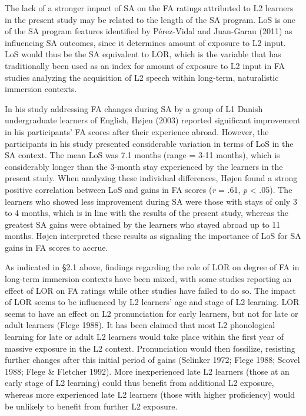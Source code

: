 \documentclass[12pt]{article}
\newenvironment{styleStandard}{\setlength\leftskip{0cm}\setlength\rightskip{0cm plus 1fil}\setlength\parindent{0cm}\setlength\parfillskip{0pt plus 1fil}\setlength\parskip{0in plus 1pt}\writerlistparindent\writerlistleftskip\leavevmode\normalfont\normalsize\writerlistlabel\ignorespaces}{\unskip\vspace{0.111in plus 0.0111in}\par}
\newcommand\writerlistleftskip{}
\newcommand\writerlistparindent{}
\newcommand\writerlistlabel{}
\begin{document}
\begin{styleStandard}
The lack of a stronger impact of SA on the FA ratings attributed to L2 learners in the present study may be related to the length of the SA program. LoS is one of the SA program features identified by Pérez-Vidal and Juan-Garau (2011) as influencing SA outcomes, since it determines amount of exposure to L2 input. LoS would thus be the SA equivalent to LOR, which is the variable that has traditionally been used as an index for amount of exposure to L2 input in FA studies analyzing the acquisition of L2 speech within long-term, naturalistic immersion contexts. 
\end{styleStandard}

\begin{styleStandard}
In his study addressing FA changes during SA by a group of L1 Danish undergraduate learners of English, Højen (2003) reported significant improvement in his participants’ FA scores after their experience abroad. However, the participants in his study presented considerable variation in terms of LoS in the SA context. The mean LoS was 7.1 months (range = 3-11 months), which is considerably longer than the 3-month stay experienced by the learners in the present study. When analyzing these individual differences, Højen found a strong positive correlation between LoS and gains in FA scores (\textit{r} = .61, \textit{p} {\textless} .05). The learners who showed less improvement during SA were those with stays of only 3 to 4 months, which is in line with the results of the present study, whereas the greatest SA gains were obtained by the learners who stayed abroad up to 11 months. Højen interpreted these results as signaling the importance of LoS for SA gains in FA scores to accrue.
\end{styleStandard}

\begin{styleStandard}
As indicated in §2.1 above, findings regarding the role of LOR on degree of FA in long-term immersion contexts have been mixed, with some studies reporting an effect of LOR on FA ratings while other studies have failed to do so. The impact of LOR seems to be influenced by L2 learners’ age and stage of L2 learning. LOR seems to have an effect on L2 pronunciation for early learners, but not for late or adult learners (Flege 1988). It has been claimed that most L2 phonological learning for late or adult L2 learners would take place within the first year of massive exposure in the L2 context. Pronunciation would then fossilize, resisting further changes after this initial period of gains (Selinker 1972; Flege 1988; Scovel 1988; Flege \& Fletcher 1992). More inexperienced late L2 learners (those at an early stage of L2 learning) could thus benefit from additional L2 exposure, whereas more experienced late L2 learners (those with higher proficiency) would be unlikely to benefit from further L2 exposure.
\end{styleStandard}
\end{document}
